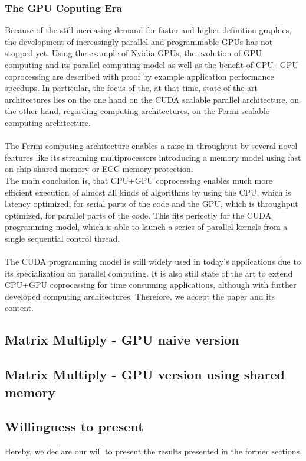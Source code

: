 \documentclass[12pt]{article}
\begin{document}
\subsubsection*{The GPU Coputing Era}
Because of the still increasing demand for faster and higher-definition graphics, the development of increasingly parallel and programmable GPUs has not stopped yet. Using the example of Nvidia GPUs, the evolution of GPU computing and its parallel computing model as well as the benefit of CPU+GPU coprocessing are described with proof by example application performance speedups. In particular, the focus of the, at that time, state of the art architectures lies on the one hand on the CUDA scalable parallel architecture, on the other hand, regarding computing architectures, on the Fermi scalable computing architecture.\\\\
The Fermi computing architecture enables a raise in throughput by several novel features like its streaming multiprocessors introducing a memory model using fast on-chip shared memory or ECC memory protection.\\
The main conclusion is, that CPU+GPU coprocessing enables much more efficient execution of almost all kinds of algorithms by using the CPU, which is latency optimized, for serial parts of the code and the GPU, which is throughput optimized, for parallel parts of the code. This fits perfectly for the CUDA programming model, which is able to launch a series of parallel kernels from a single sequential control thread.\\\\
The CUDA programming model is still widely used in today's applications due to its specialization on parallel computing. It is also still state of the art to extend CPU+GPU coprocessing for time consuming applications, although with further developed computing architectures. Therefore, we accept the paper and its content.

\vspace{10pt}

\subsection{Matrix Multiply - GPU naive version}

\subsection{Matrix Multiply - GPU version using shared memory}

\subsection{Willingness to present}
Hereby, we declare our will to present the results presented in the former sections.
\end{document}
